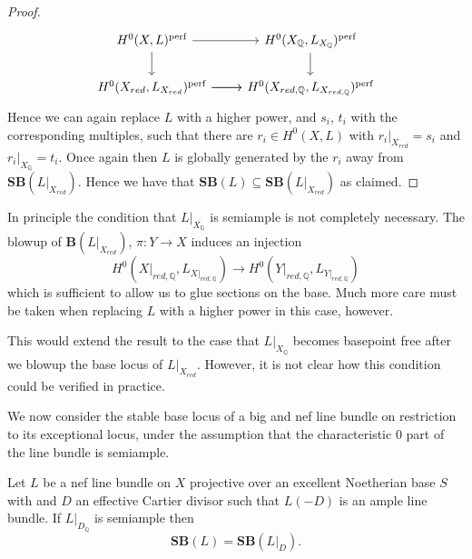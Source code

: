 \documentclass[a4paper,12pt]{book}
\newcommand{\SB}{\mathbf{SB}}
\newcommand{\BB}{\mathbf{B}}
\newcommand{\perf}{\textup{perf}}
\begin{document}
\begin{proof}
	\[
	\begin{tikzcd}
	{H^{0}(X,L)^{\perf}} \arrow[d] \arrow[r]                 & {H^{0}(X_{\mathbb{Q}},L_{X_{\mathbb{Q}}})^{\perf}} \arrow[d] \\
	{H^{0}(X_{red},L_{X_{red}})^{\perf}} \arrow[r] \arrow[r] & {H^{0}(X_{red,\mathbb{Q}},L_{X_{red,\mathbb{Q}}})^{\perf}}  
	\end{tikzcd}	
	\]
	Hence we can again replace $L$ with a higher power, and $s_{i}$, $t_{i}$ with the corresponding multiples, such that there are $r_{i} \in H^{0}(X,L)$ with $r_{i}|_{X_{red}}=s_{i}$ and $r_{i}|_{X_{\mathbb{Q}}}=t_{i}$. Once again then $L$ is globally generated by the $r_{i}$ away from $\SB(L|_{X_{red}})$. Hence we have that $\SB(L)\subseteq \SB(L|_{X_{red}})$ as claimed.
\end{proof}

\begin{remark}
	
	In principle the condition that $L|_{X_{\mathbb{Q}}}$ is semiample is not completely necessary. The blowup of $\BB(L|_{X_{red}})$, $\pi: Y \to X$ induces an injection $$H^{0}(X|_{red,\mathbb{Q}},L_{X|_{red,\mathbb{Q}}}) \to H^{0}(Y|_{red,\mathbb{Q}},L_{Y|_{red,\mathbb{Q}}})$$ which is sufficient to allow us to glue sections on the base. Much more care must be taken when replacing $L$ with a higher power in this case, however. 
		
	This would extend the result to the case that $L|_{X_{\mathbb{Q}}}$ becomes basepoint free after we blowup the base locus of $L|_{X_{red}}$. However, it is not clear how this condition could be verified in practice.
	
\end{remark}

We now consider the stable base locus of a big and nef line bundle on restriction to its exceptional locus, under the assumption that the characteristic $0$ part of the line bundle is semiample.

\begin{lemma}
	Let $L$ be a nef line bundle on $X$ projective over an excellent Noetherian base $S$ with and $D$ an effective Cartier divisor such that $L(-D)$ is an ample line bundle. If $L|_{D_{\mathbb{Q}}}$ is semiample then \[\SB(L)=\SB(L|_{D}).\]
\end{lemma}	
\end{document}
